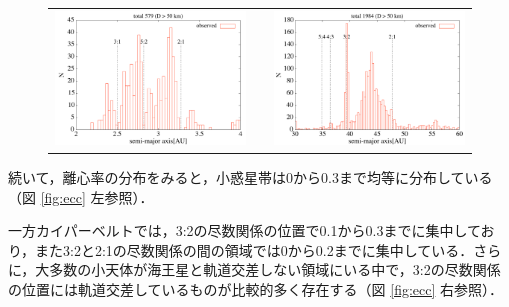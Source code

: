 \documentclass[11pt,a4paper,oneside,onecolumn]{jreport}
\begin{document}
\begin{figure}[H]
\begin{tabular}{ccc}
\begin{minipage}[t]{0.45\hsize}
\centering
\includegraphics[width=8cm]{./image/mainbelt_histogram.pdf}
\end{minipage} &
\begin{minipage}[t]{0.1\hsize}
\end{minipage} &
\begin{minipage}[t]{0.45\hsize}
\centering
\includegraphics[width=8cm]{./image/kuiperbelt_histogram.pdf}
\end{minipage}\\
%
\end{tabular}
\caption{\label{fig:histogram}}
\end{figure}

続いて，離心率の分布をみると，小惑星帯は0から0.3まで均等に分布している（図 \ref{fig:ecc} 左参照）．

一方カイパーベルトでは，3:2の尽数関係の位置で0.1から0.3までに集中しており，また3:2と2:1の尽数関係の間の領域では0から0.2までに集中している．さらに，大多数の小天体が海王星と軌道交差しない領域にいる中で，3:2の尽数関係の位置には軌道交差しているものが比較的多く存在する（図 \ref{fig:ecc} 右参照）．
\end{document}
